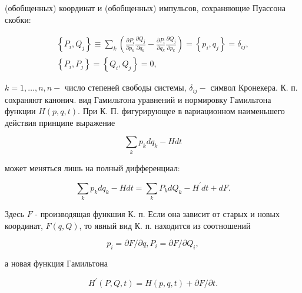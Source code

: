 \documentclass[10pt]{article}
\begin{document}
(обобщенных) координат и (обобщенных) импульсов, сохраняющие Пуассона скобки:



\[

\begin{gathered}

\left\{P_{i}, Q_{j}\right\} \equiv \sum_{k}\left(\frac{\partial P_{i}}{\partial p_{k}} \frac{\partial Q_{j}}{\partial q_{k}}-\frac{\partial P_{i}}{\partial q_{k}} \frac{\partial Q_{j}}{\partial p_{k}}\right)=\left\{p_{i}, q_{j}\right\}=\delta_{i j}, \\

\left\{P_{i}, P_{j}\right\}=\left\{Q_{i}, Q_{j}\right\}=0,

\end{gathered}

\]



$k=1, \ldots, n, n-$ число степеней свободы системы, $\delta_{i j}-$ символ Кронекера. К. п. сохраняют канонич. вид Гамильтона уравнений и нормировку Гамильтона функции $H(p, q, t)$. При К. П. фигурирующее в вариационном наименьшего действия принципе выражение



\[

\sum_{k} p_{k} d q_{k}-H d t

\]



может меняться лишь на полный дифференциал:



\[

\sum_{k} p_{k} d q_{k}-H d t=\sum_{k} P_{k} d Q_{k}-H^{\prime} d t+d F .

\]



Здесь $F$ - производящая функшия К. п. Если она зависит от старых и новых координат, $F(q, Q)$, то явный вид К. п. находится из соотношений



\[

p_{i}=\partial F / \partial q, P_{i}=\partial F / \partial Q_{i},

\]



а новая функция Гамильтона



\[

H^{\prime}(P, Q, t)=H(p, q, t)+\partial F / \partial t .

\]
\end{document}
